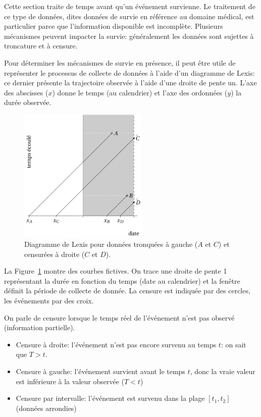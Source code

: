 \documentclass[
  11pt,
  letterpaper,
]{scrbook}
\providecommand{\tightlist}{%
  \setlength{\itemsep}{0pt}\setlength{\parskip}{0pt}}\usepackage{longtable,booktabs,array}
\theoremstyle{definition}
\theoremstyle{remark}
\begin{document}
Cette section traite de temps avant qu'un événement survienne. Le
traitement de ce type de données, dites données de survie en référence
au domaine médical, est particulier parce que l'information disponible
est incomplète. Plusieurs mécanismes peuvent impacter la survie:
généralement les données sont sujettes à troncature et à censure.

Pour déterminer les mécanismes de survie en présence, il peut être utile
de représenter le processus de collecte de données à l'aide d'un
diagramme de Lexis: ce dernier présente la trajectoire observée à l'aide
d'une droite de pente un. L'axe des abscisses (\(x\)) donne le temps (au
calendrier) et l'axe des ordonnées (\(y\)) la durée observée.

\begin{figure}[ht!]

{\centering \includegraphics[width=0.55\textwidth,height=\textheight]{figures/Lexis_censure.png}

}

\caption{\label{fig-lexis}Diagramme de Lexis pour données tronquées à
gauche (\(A\) et \(C\)) et censurées à droite (\(C\) et \(D\)).}

\end{figure}

La Figure~\ref{fig-lexis} montre des courbes fictives. On trace une
droite de pente 1 représentant la durée en fonction du temps (date au
calendrier) et la fenêtre définit la période de collecte de donnée. La
censure est indiquée par des cercles, les événements par des croix.

On parle de censure lorsque le temps réel de l'événement n'est pas
observé (information partielle).

\begin{itemize}
\tightlist
\item
  Censure à droite: l'événement n'est pas encore survenu au temps \(t\):
  on sait que \(T > t\).
\item
  Censure à gauche: l'événement survient avant le temps \(t\), donc la
  vraie valeur est inférieure à la valeur observée (\(T < t\))
\item
  Censure par intervalle: l'événement est survenu dans la plage
  \([t_1, t_2]\) (données arrondies)
\end{itemize}
\end{document}
